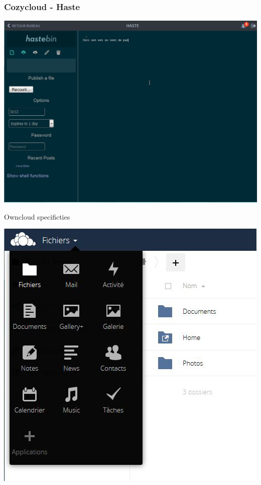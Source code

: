 \documentclass{beamer}
\begin{document}
\begin{frame}
\frametitle{Cozycloud - Haste}
\includegraphics[scale=0.3] {./CozyCloud/CozyCloud_Haste.jpg}
\end{frame}

\begin{frame}
\Huge{\centerline{Owncloud specificties}}
\begin{center}
\includegraphics[scale=0.38] {./Owncloud/OwnCloud_Liste_applications.jpg}
\end{center}
\end{frame}
\end{document}
